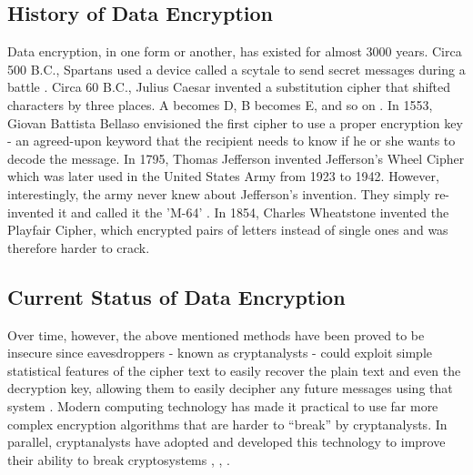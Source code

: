 \documentclass[journal]{IEEEtran}
\begin{document}
\subsection{\textbf{History of Data Encryption}}
Data encryption, in one form or another, has existed for almost 3000 years. Circa 500 B.C., Spartans used a device called a scytale to send secret messages during a battle \cite{encryption_research}. Circa 60 B.C., Julius Caesar invented a substitution cipher that shifted characters by three places. A becomes D, B becomes E, and so on \cite{encryption_research}. In 1553, Giovan Battista Bellaso envisioned the first cipher to use a proper encryption key - an agreed-upon keyword that the recipient needs to know if he or she wants to decode the message. In 1795, Thomas Jefferson invented Jefferson's Wheel Cipher which was later used in the United States Army from 1923 to 1942. However, interestingly, the army never knew about Jefferson's invention. They simply re-invented it and called it the 'M-64' \cite{encryption_research}. In 1854, Charles Wheatstone invented the Playfair Cipher, which encrypted pairs of letters instead of single ones and was therefore harder to crack.

\subsection{\textbf{Current Status of Data Encryption}}
Over time, however, the above mentioned methods have been proved to be insecure since eavesdroppers - known as cryptanalysts - could exploit simple statistical features of the cipher text to easily recover the plain text and even the decryption key, allowing them to easily decipher any future messages using that system \cite{encryption_today}. Modern computing technology has made it practical to use far more complex encryption algorithms that are harder to “break” by cryptanalysts. In parallel, cryptanalysts have adopted and developed this technology to improve their ability to break cryptosystems \cite{des_cryptanalysis}, \cite{rijndael_cryptanalysis}, \cite{rsa_cryptanalysis}. 
\end{document}
